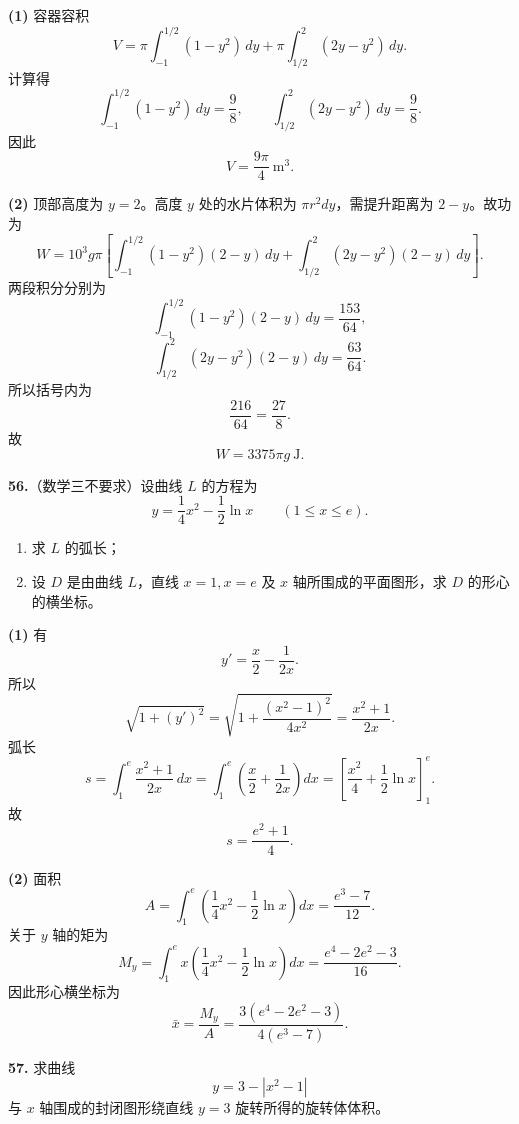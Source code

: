 \begin{solutionblock}
\textbf{(1)} 容器容积
\[
V=\pi\int_{-1}^{1/2}(1-y^2)\,dy
+\pi\int_{1/2}^{2}(2y-y^2)\,dy.
\]
计算得
\[
\int_{-1}^{1/2}(1-y^2)\,dy=\frac98,\qquad
\int_{1/2}^{2}(2y-y^2)\,dy=\frac98.
\]
因此
\[
\boxed{V=\frac{9\pi}{4}\ \mathrm{m^3}}.
\]

\textbf{(2)} 顶部高度为 \(y=2\)。高度 \(y\) 处的水片体积为 \(\pi r^2dy\)，需提升距离为 \(2-y\)。故功为
\[
W=10^3g\pi\left[
\int_{-1}^{1/2}(1-y^2)(2-y)\,dy
+\int_{1/2}^{2}(2y-y^2)(2-y)\,dy
\right].
\]
两段积分分别为
\[
\int_{-1}^{1/2}(1-y^2)(2-y)\,dy=\frac{153}{64},
\]
\[
\int_{1/2}^{2}(2y-y^2)(2-y)\,dy=\frac{63}{64}.
\]
所以括号内为
\[
\frac{216}{64}=\frac{27}{8}.
\]
故
\[
\boxed{W=3375\pi g\ \mathrm{J}}.
\]
\end{solutionblock}

\begin{problemblock}
\textbf{56.}（数学三不要求）设曲线 \(L\) 的方程为
\[
y=\frac14x^2-\frac12\ln x\qquad(1\le x\le e).
\]
\begin{enumerate}
\item 求 \(L\) 的弧长；
\item 设 \(D\) 是由曲线 \(L\)，直线 \(x=1,x=e\) 及 \(x\) 轴所围成的平面图形，求 \(D\) 的形心的横坐标。
\end{enumerate}
\end{problemblock}

\begin{solutionblock}
\textbf{(1)} 有
\[
y'=\frac{x}{2}-\frac{1}{2x}.
\]
所以
\[
\sqrt{1+(y')^2}
=\sqrt{1+\frac{(x^2-1)^2}{4x^2}}
=\frac{x^2+1}{2x}.
\]
弧长
\[
s=\int_1^e\frac{x^2+1}{2x}\,dx
=\int_1^e\left(\frac{x}{2}+\frac{1}{2x}\right)dx
=\left[\frac{x^2}{4}+\frac12\ln x\right]_1^e.
\]
故
\[
\boxed{s=\frac{e^2+1}{4}}.
\]

\textbf{(2)} 面积
\[
A=\int_1^e\left(\frac14x^2-\frac12\ln x\right)dx
=\frac{e^3-7}{12}.
\]
关于 \(y\) 轴的矩为
\[
M_y=\int_1^e x\left(\frac14x^2-\frac12\ln x\right)dx
=\frac{e^4-2e^2-3}{16}.
\]
因此形心横坐标为
\[
\bar x=\frac{M_y}{A}
=\boxed{\frac{3(e^4-2e^2-3)}{4(e^3-7)}}.
\]
\end{solutionblock}

\begin{problemblock}
\textbf{57.} 求曲线
\[
y=3-|x^2-1|
\]
与 \(x\) 轴围成的封闭图形绕直线 \(y=3\) 旋转所得的旋转体体积。
\end{problemblock}


